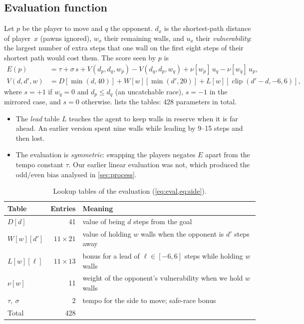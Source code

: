 \subsection{Evaluation function}
\label{sec:eval}
Let $p$ be the player to move and $q$ the opponent. $d_x$ is the shortest-path distance of
player~$x$ (pawns ignored), $w_x$ their remaining walls, and $u_x$ their
\emph{vulnerability}: the largest number of extra steps that one wall on the first eight steps
of their shortest path would cost them. The score seen by $p$ is
\begin{align}
  E(p) &= \tau + \sigma\, s + V(d_p, d_q, w_p) - V(d_q, d_p, w_q)
          + \nu[w_p]\, u_q - \nu[w_q]\, u_p, \label{eq:eval}\\
  V(d, d', w) &= D[\min(d,40)] + W[w][\min(d',20)] + L[w][\operatorname{clip}(d'-d,-6,6)],
  \label{eq:side}
\end{align}
where $s = +1$ if $w_q = 0$ and $d_p \le d_q$ (an uncatchable race), $s=-1$ in the mirrored
case, and $s = 0$ otherwise.
 lists the tables: 428 parameters in total.
\begin{itemize}
  \item The \emph{lead} table $L$ teaches the agent to keep walls in reserve when it is far
        ahead. An earlier version spent nine walls while leading by 9--15 steps and then lost.
  \item The evaluation is \emph{symmetric}: swapping the players negates $E$ apart from the
        tempo constant $\tau$. Our earlier linear evaluation was not, which produced the
        odd/even bias analysed in \cref{sec:process}.
\end{itemize}

\begin{table}[!htbp]
\centering\small
\caption{Lookup tables of the evaluation (\cref{eq:eval,eq:side}).}
\label{tab:features}
\begin{tabularx}{\linewidth}{@{}l r X@{}}
\toprule
Table & Entries & Meaning \\
\midrule
$D[d]$ & 41 & value of being $d$ steps from the goal \\
$W[w][d']$ & $11\times21$ & value of holding $w$ walls when the opponent is $d'$ steps away \\
$L[w][\ell]$ & $11\times13$ & bonus for a lead of $\ell\in[-6,6]$ steps while holding $w$ walls \\
$\nu[w]$ & 11 & weight of the opponent's vulnerability when we hold $w$ walls \\
$\tau,\ \sigma$ & 2 & tempo for the side to move; safe-race bonus \\
\midrule
Total & 428 & \\
\bottomrule
\end{tabularx}
\end{table}

